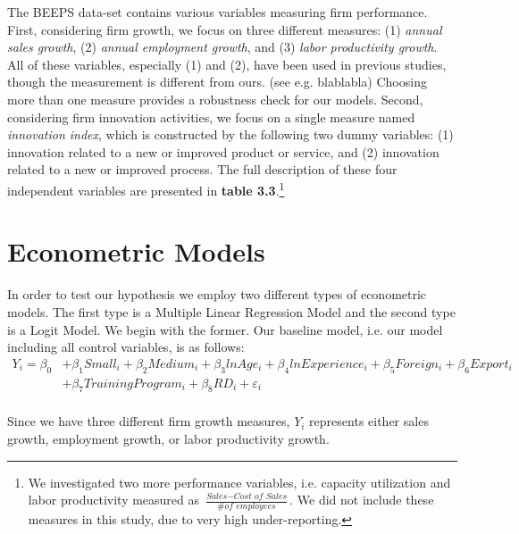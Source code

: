 The BEEPS data-set contains various variables measuring firm performance. First, considering firm growth, we focus on three different measures: (1) \textit{annual sales growth}, (2) \textit{annual employment growth}, and (3) \textit{labor productivity growth}. All of these variables, especially (1) and (2), have been used in previous studies, though the measurement is different from ours. (see e.g. blablabla) Choosing more than one measure provides a robustness check for our models. Second, considering firm innovation activities, we focus on a single measure named \textit{innovation index}, which is constructed by the following two dummy variables: (1) innovation related to a new or improved product or service, and (2) innovation related to a new or improved process. The full description of these four independent variables are presented in \textbf{table 3.3}.\footnote{We investigated two more performance variables, i.e. capacity utilization and labor productivity measured as $\frac{\textit{Sales}-\textit{Cost of Sales}}{\textit{\# of employees}}$. We did not include these measures in this study, due to very high under-reporting.}

\section{Econometric Models}
In order to test our hypothesis we employ two different types of econometric models. The first type is a Multiple Linear Regression Model and the second type is a Logit Model.
We begin with the former. Our baseline model, i.e. our model including all control variables, is as follows:
\reqnomode
\begin{equation}\tag{Baseline}
 \begin{split}\label{eq:1}
Y_{i}=\beta_{0}&+\beta_{1}Small_{i}+\beta_{2}Medium_{i}+\beta_{3}lnAge_{i}+\beta_{4}lnExperience_{i}+\beta_{5}Foreign_{i}+\beta_{6}Export_{i}\\
 &+\beta_{7}TrainingProgram_{i}+\beta_{8}RD_{i}+\varepsilon_{i}\\
 \end{split}
\end{equation}

Since we have three different firm growth measures, $Y_{i}$ represents either sales growth, employment growth, or labor productivity growth. 

